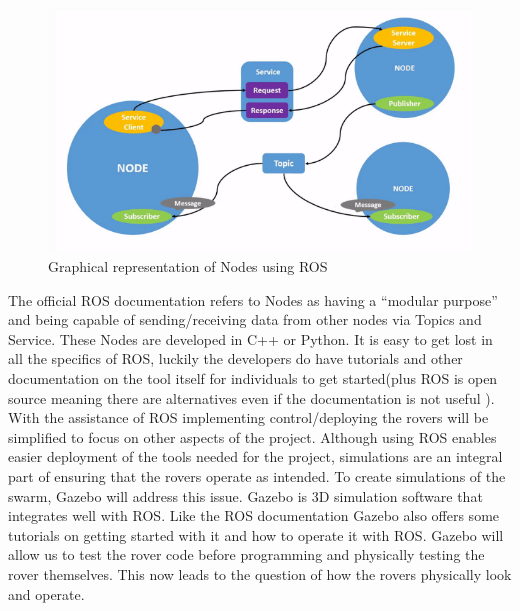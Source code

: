 \documentclass[conference]{IEEEtran}
\begin{document}
\begin{figure}
\includegraphics[width=\linewidth]{graph.png}
\caption{Graphical representation of Nodes using ROS \cite{RN202}}
\end{figure}

The official ROS documentation refers to Nodes as having a “modular purpose” \cite{RN202} and being capable of sending/receiving data from other nodes via Topics and Service. These Nodes are developed in C++ or Python. It is easy to get lost in all the specifics of ROS, luckily the developers do have tutorials and other documentation on the tool itself for individuals to get started(plus ROS is open source meaning there are alternatives even if the documentation is not useful \cite{RN200}). With the assistance of ROS implementing control/deploying the rovers will be simplified to focus on other aspects of the project. 
Although using ROS enables easier deployment of the tools needed for the project, simulations are an integral part of ensuring that the rovers operate as intended. To create simulations of the swarm, Gazebo will address this issue. Gazebo is 3D simulation software that integrates well with ROS\cite{RN202}. Like the ROS documentation Gazebo also offers some tutorials on getting started with it and how to operate it with ROS. Gazebo will allow us to test the rover code before programming and physically testing the rover themselves. This now leads to the question of how the rovers physically look and operate.
\end{document}
